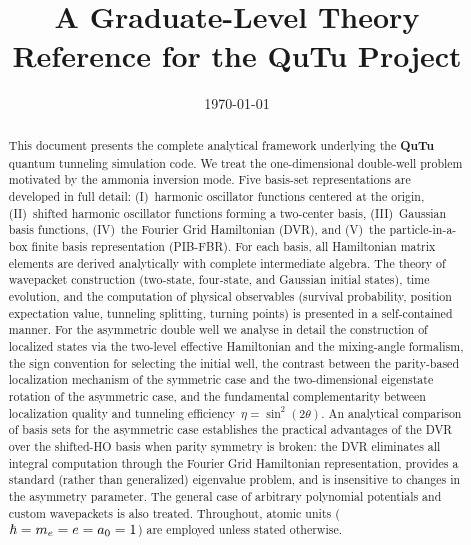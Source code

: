 \documentclass[12pt, a4paper, final]{article}
\author{\authorname}
\title{
  \vspace{-1cm}
  \textbf{\ttitle}\\[0.8em]
  \large\stitle\\[0.4em]
  \normalsize A Graduate-Level Theory Reference for the QuTu Project
}
\date{\today}
\begin{document}

%
%
%
\maketitle
%
%
% 
%
%
%
%

\begin{abstract}
This document presents the complete analytical framework underlying the
\textbf{QuTu} quantum tunneling simulation code. We treat the
one-dimensional double-well problem motivated by the ammonia inversion
mode. Five basis-set representations are developed in full detail:
(I)~harmonic oscillator functions centered at the origin,
(II)~shifted harmonic oscillator functions forming a two-center basis,
(III)~Gaussian basis functions, (IV)~the Fourier Grid Hamiltonian
(DVR), and (V)~the particle-in-a-box finite basis representation (PIB-FBR).
For each basis, all Hamiltonian matrix elements are derived
analytically with complete intermediate algebra. The theory of
wavepacket construction (two-state, four-state, and Gaussian initial
states), time evolution, and the computation of physical observables
(survival probability, position expectation value, tunneling splitting,
turning points) is presented in a self-contained manner.
For the asymmetric double well we analyse in detail the construction of
localized states via the two-level effective Hamiltonian and the
mixing-angle formalism, the sign convention for selecting the initial
well, the contrast between the parity-based localization mechanism of
the symmetric case and the two-dimensional eigenstate rotation of the
asymmetric case, and the fundamental complementarity between
localization quality and tunneling efficiency~$\eta = \sin^2(2\theta)$.
An analytical comparison of basis sets for the asymmetric case
establishes the practical advantages of the DVR over the shifted-HO
basis when parity symmetry is broken: the DVR eliminates all integral
computation through the Fourier Grid Hamiltonian representation,
provides a standard (rather than generalized) eigenvalue problem, and
is insensitive to changes in the asymmetry parameter.
The general case of arbitrary polynomial potentials and custom
wavepackets is also treated. Throughout, atomic units
($\hbar = m_e = e = a_0 = 1$) are employed unless stated otherwise.
\end{abstract}
\end{document}
